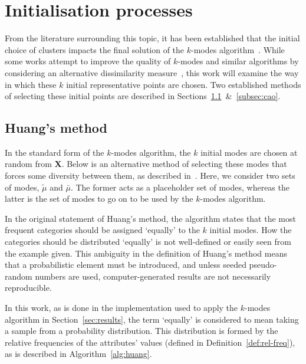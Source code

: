\section{Initialisation processes}\label{sec:init}

From the literature surrounding this topic, it has been established that the 
initial choice of clusters impacts the final solution of the \(k\)-modes
algorithm~\cite{Cao2009, Huang1998}. While some works attempt to improve the
quality of \(k\)-modes and similar algorithms by considering an alternative 
dissimilarity measure~\cite{Ng2007}, this work will examine the way in which
these \(k\) initial representative points are chosen. Two established methods of 
selecting these initial points are described in
Sections~\ref{subsec:huang}~\&~\ref{subsec:cao}.


\subsection{Huang's method}\label{subsec:huang}

In the standard form of the \(k\)-modes algorithm, the \(k\) initial modes are 
chosen at random from \textbf{X}. Below is an alternative method of selecting
these modes that forces some diversity between them, as described 
in~\cite{Huang1998}. Here, we consider two sets of modes, \(\tilde{\mu}\) and
\(\bar{\mu}\). The former acts as a placeholder set of modes, whereas the latter
is the set of modes to go on to be used by the \(k\)-modes algorithm.

\begin{singlespace}
    
\end{singlespace}

In the original statement of Huang's method, the algorithm states that the most
frequent categories should be assigned `equally' to the \(k\) initial modes. How
the categories should be distributed `equally' is not well-defined or easily
seen from the example given. This ambiguity in the definition of Huang's method
means that a probabilistic element must be introduced, and unless seeded
pseudo-random numbers are used, computer-generated results are not necessarily
reproducible.

In this work, as is done in the implementation used to apply the \(k\)-modes
algorithm in Section~\ref{sec:results}, the term `equally' is considered to mean
taking a sample from a probability distribution. This distribution is formed by
the relative frequencies of the attributes' values (defined in
Definition~\ref{def:rel-freq}), as is described in Algorithm~\ref{alg:huang}.

